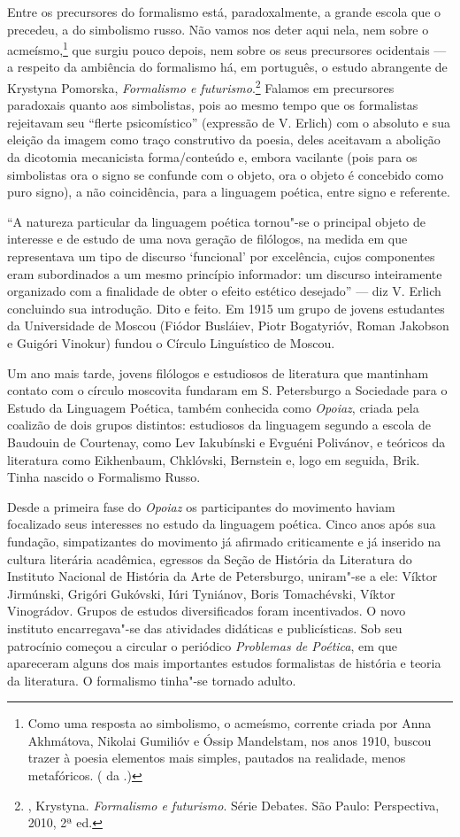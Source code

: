 Entre os precursores do formalismo está, paradoxalmente, a grande escola
que o precedeu, a do simbolismo russo. Não vamos nos deter aqui nela, nem sobre o acmeísmo,\footnote{Como uma resposta ao simbolismo, 
o acmeísmo, corrente criada por Anna Akhmátova, Nikolai Gumilióv e 
Óssip Mandelstam, nos anos 1910, buscou trazer à poesia elementos mais
 simples, pautados na realidade, menos metafóricos. ( da 
.)} que surgiu pouco depois, nem sobre os seus
precursores ocidentais --- a respeito da ambiência do formalismo há, em
português, o estudo abrangente de Krystyna Pomorska, \emph{Formalismo e
futurismo}.\footnote{, Krystyna. \emph{Formalismo
 e futurismo}. Série Debates. São Paulo: Perspectiva, 2010, 2ª ed.} Falamos em precursores paradoxais quanto aos simbolistas,
pois ao mesmo tempo que os formalistas rejeitavam seu ``flerte
psicomístico'' (expressão de V. Erlich) com o absoluto e sua eleição da
imagem como traço construtivo da poesia, deles aceitavam a abolição da
dicotomia mecanicista forma/conteúdo e, embora vacilante (pois para os
simbolistas ora o signo se confunde com o objeto, ora o objeto é
concebido como puro signo), a não coincidência, para a linguagem
poética, entre signo e referente.

``A natureza particular da linguagem poética tornou"-se o principal
objeto de interesse e de estudo de uma nova geração de filólogos, na
medida em que representava um tipo de discurso `funcional' por
excelência, cujos componentes eram subordinados a um mesmo princípio
informador: um discurso inteiramente organizado com a finalidade de
obter o efeito estético desejado'' --- diz V. Erlich concluindo sua
introdução. Dito e feito. Em 1915 um grupo de jovens estudantes da
Universidade de Moscou (Fiódor Busláiev, Piotr Bogatyrióv, Roman Jakobson e Guigóri
Vinokur) fundou o Círculo Linguístico de Moscou.

Um ano mais tarde, jovens filólogos e estudiosos de literatura que
mantinham contato com o círculo moscovita fundaram em S. Petersburgo a
Sociedade para o Estudo da Linguagem Poética, também conhecida como
\emph{Opoiaz}, criada pela coalizão de dois grupos distintos: estudiosos
da linguagem segundo a escola de Baudouin de Courtenay, como Lev Iakubínski
e Evguéni Polivánov, e teóricos da literatura como Eikhenbaum, Chklóvski, Bernstein e, logo em seguida, Brik. Tinha
nascido o Formalismo Russo.

Desde a primeira fase do \emph{Opoiaz} os participantes do movimento
haviam focalizado seus interesses no estudo da linguagem poética. Cinco
anos após sua fundação, simpatizantes do movimento já afirmado
criticamente e já inserido na cultura literária acadêmica, egressos da
Seção de História da Literatura do Instituto Nacional de História da
Arte de Petersburgo, uniram"-se a ele: Víktor Jirmúnski, Grigóri Gukóvski, Iúri
Tyniánov, Boris Tomachévski, Víktor Vinográdov. Grupos de estudos
diversificados foram incentivados. O novo instituto encarregava"-se das
atividades didáticas e publicísticas. Sob seu patrocínio começou a
circular o periódico \emph{Problemas de Poética}, em que apareceram alguns
dos mais importantes estudos formalistas de história e teoria da
literatura. O formalismo tinha"-se tornado adulto.

